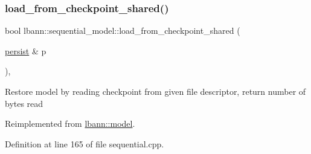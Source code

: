 \subsubsection{\texorpdfstring{load\+\_\+from\+\_\+checkpoint\+\_\+shared()}{load\_from\_checkpoint\_shared()}}
{\footnotesize\ttfamily bool lbann\+::sequential\+\_\+model\+::load\+\_\+from\+\_\+checkpoint\+\_\+shared (\begin{DoxyParamCaption}\item[{\hyperlink{classlbann_1_1persist}{persist} \&}]{p }\end{DoxyParamCaption})\hspace{0.3cm}{\ttfamily [override]}, {\ttfamily [virtual]}}

Restore model by reading checkpoint from given file descriptor, return number of bytes read 

Reimplemented from \hyperlink{classlbann_1_1model_a2e02dda11636e015ea0c892ffa541881}{lbann\+::model}.



Definition at line 165 of file sequential.\+cpp.


